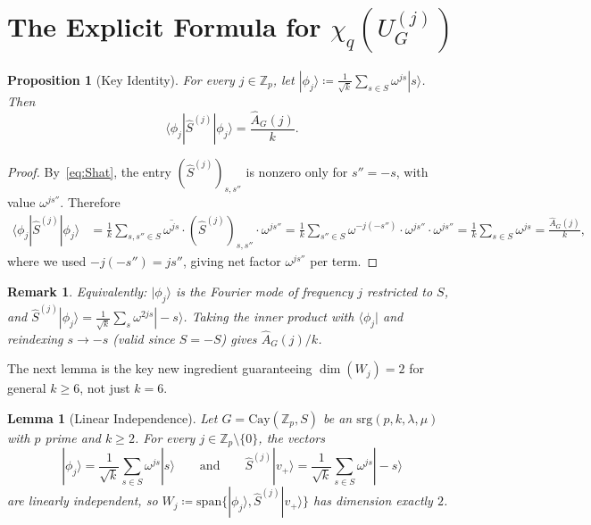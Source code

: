 \documentclass[12pt]{article}
\newtheorem{lemma}[theorem]{Lemma}
\newtheorem{proposition}[theorem]{Proposition}
\newtheorem{remark}[theorem]{Remark}
\newcommand{\Z}{\mathbb{Z}}
\newcommand{\Cay}{\mathrm{Cay}}
\newcommand{\srg}{\mathrm{srg}}
\newcommand{\eqdef}{\coloneqq}
\newcommand{\ket}[1]{|#1\rangle}
\newcommand{\bra}[1]{\langle #1|}
\newcommand{\Uj}{U_G^{(j)}}
\newcommand{\Shat}{\hat{S}^{(j)}}
\newcommand{\Ahat}{\widehat{A}_G}
\newcommand{\vplus}{v_+}
\newcommand{\phij}{\phi_j}
\begin{document}
\section{The Explicit Formula for
  \texorpdfstring{$\chi_q(\Uj)$}{chi\_q(U\^{}j)}}
\label{sec:formula}

\begin{proposition}[Key Identity]\label{prop:key}
  For every $j \in \Z_p$, let
  $\ket{\phij} \eqdef \frac{1}{\sqrt{k}}\sum_{s \in S}\omega^{js}\ket{s}$.
  Then
  \[
    \bra{\phij}\Shat\ket{\phij} = \frac{\Ahat(j)}{k}.
  \]
\end{proposition}

\begin{proof}
  By~\eqref{eq:Shat}, the entry $(\Shat)_{s,s''}$ is nonzero only for
  $s'' = -s$, with value $\omega^{js''}$.  Therefore
  \begin{align*}
    \bra{\phij}\Shat\ket{\phij}
    &= \frac{1}{k}\sum_{s,s'' \in S}
       \overline{\omega^{js}} \cdot (\Shat)_{s,s''} \cdot \omega^{js''}
    = \frac{1}{k}\sum_{s'' \in S}
      \omega^{-j(-s'')} \cdot \omega^{js''} \cdot \omega^{js''}
    = \frac{1}{k}\sum_{s \in S}\omega^{js}
    = \frac{\Ahat(j)}{k},
  \end{align*}
  where we used $-j(-s'')=js''$, giving net factor $\omega^{js''}$ per term.
\end{proof}

\begin{remark}
  Equivalently: $\ket{\phij}$ is the Fourier mode of frequency $j$
  restricted to $S$, and $\Shat\ket{\phij}
  = \frac{1}{\sqrt{k}}\sum_s\omega^{2js}\ket{-s}$.  Taking the inner
  product with $\bra{\phij}$ and reindexing $s \to -s$ (valid since
  $S=-S$) gives $\Ahat(j)/k$.
\end{remark}

The next lemma is the key new ingredient guaranteeing $\dim(W_j)=2$ for
general $k \geq 6$, not just $k=6$.

\begin{lemma}[Linear Independence]\label{lem:lindep}
  Let $G = \Cay(\Z_p, S)$ be an $\srg(p,k,\lambda,\mu)$ with $p$ prime
  and $k \geq 2$.  For every $j \in \Z_p \setminus \{0\}$, the vectors
  \[
    \ket{\phij} = \frac{1}{\sqrt{k}}\sum_{s \in S}\omega^{js}\ket{s}
    \qquad\text{and}\qquad
    \Shat\ket{\vplus} = \frac{1}{\sqrt{k}}\sum_{s \in S}\omega^{js}\ket{-s}
  \]
  are linearly independent, so
  $W_j \eqdef \mathrm{span}\{\ket{\phij},\Shat\ket{\vplus}\}$
  has dimension exactly $2$.
\end{lemma}
\end{document}
